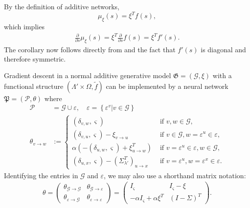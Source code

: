 \documentclass[a4paper,11pt]{report}
\newcommand{\const}{\varsigma} %
\begin{document}
\begin{Bew}
By the definition of additive networks, 
\[
\mu_{\xi}(s)=\xi^Tf(s),
\]
which implies
\begin{align*}
\frac{\partial}{\partial s}\mu_{\xi}(s)=\xi^T\frac{\partial}{\partial s}f(s)=\xi^Tf'(s).
\end{align*}
The corollary now follows directly from  and the fact that $f'(s)$ is diagonal and therefore symmetric.
\end{Bew}

\begin{The}\label{the:add-predicode}
Gradient descent in a normal additive generative model $\mathfrak{G}=(\mathcal{G},\xi)$ with a functional structure $(\Lambda'\times\Omega,\tilde{f})$ can be implemented by a neural network $\mathfrak{P}=(\mathcal{P},\theta)$ where
\begin{equation}\label{eq:add-predicode}
\begin{aligned}
\mathcal{P}&=\mathcal{G}\cup\varepsilon,
\quad
\varepsilon=\left\{\varepsilon^v|v\in\mathcal{G}\right\}\\
\theta_{v\to w}&:=
\begin{cases}
(\delta_{v,w},\const) &\text{ if }v,w\in\mathcal{G},\\
(\delta_{v,u},\const)-\xi_{v\to u} &\text{ if }v\in\mathcal{G},w=\varepsilon^u\in\varepsilon,\\
\alpha\left(-(\delta_{u,w},\const)+\xi^T_{u\to w} \right) &\text{ if }v=\varepsilon^u\in\varepsilon,w\in\mathcal{G},\\
(\delta_{u,x},\const)-\left(\Sigma_{\lambda'}^T\right)_{u\to x} &\text{ if }v=\varepsilon^u,w=\varepsilon^x\in\varepsilon.
\end{cases}
\end{aligned}
\end{equation}
Identifying the entries in $\mathcal{G}$ and $\varepsilon$, we may also use a shorthand matrix notation:
\begin{align*}
\theta=
\begin{pmatrix}
\theta_{\mathcal{G}\to\mathcal{G}} & \theta_{\mathcal{G}\to\varepsilon}\\
\theta_{\varepsilon\to\mathcal{G}} & \theta_{\varepsilon\to\varepsilon}
\end{pmatrix}
=
\begin{pmatrix}
I_{\const} & I_{\const}-\xi\\
-\alpha I_{\const}+\alpha\xi^T & (I-\Sigma)^T
\end{pmatrix}.

\end{align*}
\end{The}
\end{document}
